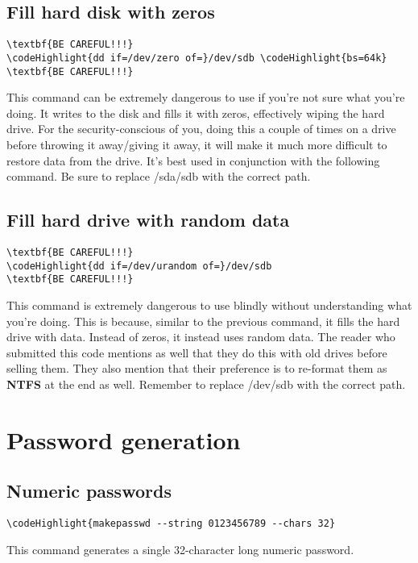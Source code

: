 \documentclass[12pt,a4paper]{article}
\begin{document}
\subsection{Fill hard disk with zeros}
\begin{Verbatim}[commandchars=\\\{\}]
\textbf{BE CAREFUL!!!}
\codeHighlight{dd if=/dev/zero of=}/dev/sdb \codeHighlight{bs=64k}
\textbf{BE CAREFUL!!!}
\end{Verbatim}
This command can be extremely dangerous to use if you're not sure what you're doing.  It writes to the disk and fills it with zeros, effectively wiping the hard drive.  For the security-conscious of you, doing this a couple of times on a drive before throwing it away/giving it away, it will make it much more difficult to restore data from the drive.  It's best used in conjunction with the following command.  Be sure to replace /sda/sdb with the correct path.

\subsection{Fill hard drive with random data}
\begin{Verbatim}[commandchars=\\\{\}]
\textbf{BE CAREFUL!!!}
\codeHighlight{dd if=/dev/urandom of=}/dev/sdb
\textbf{BE CAREFUL!!!}
\end{Verbatim}
This command is extremely dangerous to use blindly without understanding what you're doing.  This is because, similar to the previous command, it fills the hard drive with data.  Instead of zeros, it instead uses random data.  The reader who submitted this code mentions as well that they do this with old drives before selling them.  They also mention that their preference is to re-format them as \textbf{NTFS} at the end as well.  Remember to replace /dev/sdb with the correct path.

\section{Password generation}
\label{Password generation}
\subsection{Numeric passwords}
\begin{Verbatim}[commandchars=\\\{\}]
\codeHighlight{makepasswd --string 0123456789 --chars 32}
\end{Verbatim}
This command generates a single 32-character long numeric password.
\end{document}
